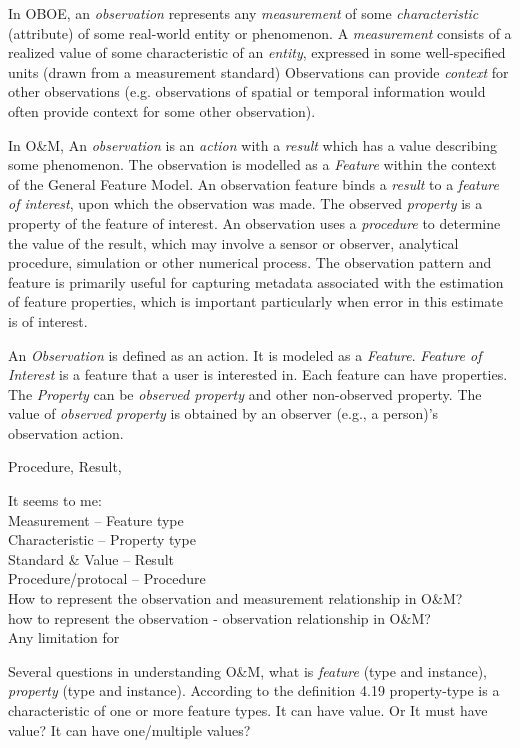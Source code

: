 \documentclass{article}
\begin{document}
In OBOE, an {\em observation} represents any {\em measurement} of some {\em characteristic} 
(attribute) of some real-world entity or phenomenon.
A {\em measurement} consists of a realized value of some characteristic of an {\em entity}, 
expressed in some well-specified units (drawn from a measurement standard) 
Observations can provide {\em context} for other observations  
(e.g. observations of spatial or temporal information would often provide context for some other observation). 
 
In O\&M, 
An {\em observation} is an {\em action} with a {\em result} which has a value describing some phenomenon.  
The observation is modelled as a {\em Feature} within the context of the General Feature Model.  
An observation feature binds a {\em result} to a {\em feature of interest}, upon which the observation was made.  
The observed {\em property} is a property of the feature of interest. 
An observation uses a {\em procedure} to determine the value of the result, 
which may involve a sensor or observer, analytical procedure, simulation or other numerical process.  
The observation pattern and feature is primarily useful for capturing metadata associated 
with the estimation of feature properties, which is important  particularly when error in this estimate is of interest.

An {\em Observation} is defined as an action. 
It is modeled as a {\em Feature}. 
{\em Feature of Interest} is a feature that a user is interested in. 
Each feature can have properties. The {\em Property} can be {\em observed property} and other non-observed property. 
The value of {\em observed property} is obtained by an observer (e.g., a person)'s observation action.  

Procedure, Result, 

It seems to me: \\
Measurement  -- Feature type\\
Characteristic -- Property type\\
Standard \& Value -- Result\\
Procedure/protocal -- Procedure\\

How to represent the observation and measurement relationship in O\&M? \\
how to represent the observation - observation relationship in O\&M?\\
Any limitation for 

Several questions in understanding O\&M, 
what is {\em feature} (type and instance), {\em property} (type and instance).
According to the definition  4.19 
property-type is a characteristic of one or more feature types. 
It can have value. Or It must have value? 
It can have one/multiple values?  
\end{document}
